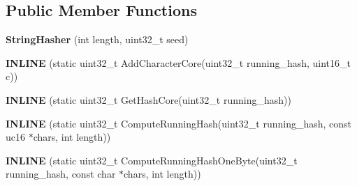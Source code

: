 \subsection*{Public Member Functions}
\begin{DoxyCompactItemize}
\item 
{\bfseries String\+Hasher} (int length, uint32\+\_\+t seed)\hypertarget{classv8_1_1internal_1_1_string_hasher_af4f8239d27611f3ae046e1e48053ea45}{}\label{classv8_1_1internal_1_1_string_hasher_af4f8239d27611f3ae046e1e48053ea45}

\item 
{\bfseries I\+N\+L\+I\+NE} (static uint32\+\_\+t Add\+Character\+Core(uint32\+\_\+t running\+\_\+hash, uint16\+\_\+t c))\hypertarget{classv8_1_1internal_1_1_string_hasher_a23495a72164e10ee8d52fb6fa4d25a74}{}\label{classv8_1_1internal_1_1_string_hasher_a23495a72164e10ee8d52fb6fa4d25a74}

\item 
{\bfseries I\+N\+L\+I\+NE} (static uint32\+\_\+t Get\+Hash\+Core(uint32\+\_\+t running\+\_\+hash))\hypertarget{classv8_1_1internal_1_1_string_hasher_af6fc8d62789d14fb989a180ad42783fe}{}\label{classv8_1_1internal_1_1_string_hasher_af6fc8d62789d14fb989a180ad42783fe}

\item 
{\bfseries I\+N\+L\+I\+NE} (static uint32\+\_\+t Compute\+Running\+Hash(uint32\+\_\+t running\+\_\+hash,                                                                                                                                                                       const uc16 $\ast$chars, int length))\hypertarget{classv8_1_1internal_1_1_string_hasher_aacc72554cbe9a99aff558bb5cf670006}{}\label{classv8_1_1internal_1_1_string_hasher_aacc72554cbe9a99aff558bb5cf670006}

\item 
{\bfseries I\+N\+L\+I\+NE} (static uint32\+\_\+t Compute\+Running\+Hash\+One\+Byte(uint32\+\_\+t running\+\_\+hash,                                                                                                                                                                                                   const char $\ast$chars,                                                                                                                                                                                                   int length))\hypertarget{classv8_1_1internal_1_1_string_hasher_a9f513f50a01e20c9b8bbfd78a6109a42}{}\label{classv8_1_1internal_1_1_string_hasher_a9f513f50a01e20c9b8bbfd78a6109a42}

\end{DoxyCompactItemize}

